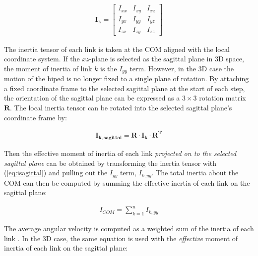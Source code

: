 \begin{equation}
	\begin{aligned}
		\mathbf{I_k} = \left[ {\begin{array}{*{20}{c}}
{{I_{xx}}}&{{I_{xy}}}&{{I_{xz}}}\\
{{I_{yx}}}&{{I_{yy}}}&{{I_{yz}}}\\
{{I_{zx}}}&{{I_{zy}}}&{{I_{zz}}}
\end{array}} \right]
	\end{aligned}
\end{equation}

The inertia tensor of each link is taken at the COM aligned with the local coordinate system. If the $xz$-plane is selected as the sagittal plane in 3D space, the moment of inertia of link $k$ is the $I_{yy}$ term. However, in the 3D case the motion of the biped is no longer fixed to a single plane of rotation. By attaching a fixed coordinate frame to the selected sagittal plane at the start of each step, the orientation of the sagittal plane can be expressed as a $3\times3$ rotation matrix $\mathbf{R}$. The local inertia tensor can be rotated into the selected sagittal plane's coordinate frame by: 

\begin{equation}
	\begin{aligned}
		\mathbf{I_{k,sagittal}} = \mathbf{R} \cdot \mathbf{I_k} \cdot {\mathbf{R^T}}
	\end{aligned}
	\label{eq:isagittal}
\end{equation}

Then the effective moment of inertia of each link \emph{projected on to the selected sagittal plane} can be obtained by transforming the inertia tensor with (\ref{eq:isagittal}) and pulling out the $I_{yy}$ term, $I_{k,yy}$. The total inertia about the COM can then be computed by summing the effective inertia of each link on the sagittal plane: 

\begin{equation}
	\begin{aligned}
		{I_{COM}} = \sum\limits_{k = 1}^n {{I_{k,yy}}}
	\end{aligned}
	\label{eq:icom_3d}
\end{equation}

The average angular velocity is computed as a weighted sum of the inertia of each link \cite{Wight:2008ii}. In the 3D case, the same equation is used with the \emph{effective} moment of inertia of each link on the sagittal plane: 

